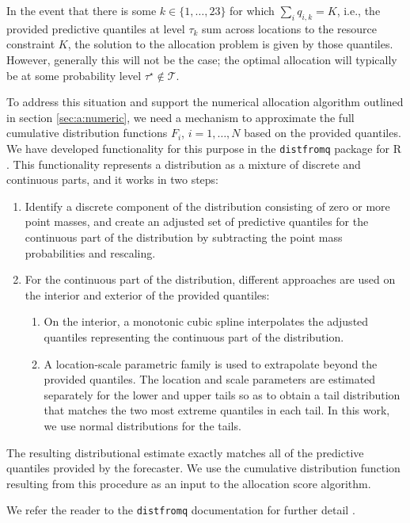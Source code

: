 \documentclass{article}\usepackage[]{graphicx}\usepackage[]{xcolor}
\begin{document}
In the event that there is some $k \in \{1, \ldots, 23\}$ for which $\sum_i q_{i,k} = K$, i.e., the provided predictive
quantiles at level $\tau_k$ sum across locations to the resource constraint $K$, the solution to the allocation problem
is given by those quantiles. However, generally this will not be the case; the optimal allocation will typically be at
some probability level $\tau^\star \notin \mathcal{T}$.

To address this situation and support the numerical allocation algorithm outlined in section \ref{sec:a:numeric}, we need
a mechanism to approximate the full cumulative distribution functions $F_i$, $i = 1, \ldots, N$ based on the provided
quantiles. We have developed functionality for this purpose in the \verb`distfromq` package for R \citep{ray-distfromq}.
This functionality represents a distribution as a mixture of discrete and continuous parts, and it works in two steps:
\begin{enumerate}
  \item Identify a discrete component of the distribution consisting of zero or more point masses, and create an
    adjusted set of predictive quantiles for the continuous part of the distribution by subtracting the point mass
    probabilities and rescaling.
  \item For the continuous part of the distribution, different approaches are used on the interior and exterior of the
    provided quantiles:
  \begin{enumerate}
    \item On the interior, a monotonic cubic spline interpolates the adjusted quantiles representing the continuous part
      of the distribution.
    \item A location-scale parametric family is used to extrapolate beyond the provided quantiles. The location and
      scale parameters are estimated separately for the lower and upper tails so as to obtain a tail distribution that
      matches the two most extreme quantiles in each tail. In this work, we use normal distributions for the tails.
  \end{enumerate}
\end{enumerate}
The resulting distributional estimate exactly matches all of the predictive quantiles provided by the forecaster. We use
the cumulative distribution function resulting from this procedure as an input to the allocation score algorithm.

We refer the reader to the \verb`distfromq` documentation for further detail \citep{ray-distfromq}.
\end{document}
